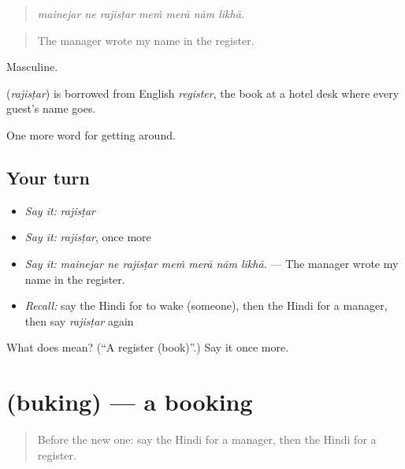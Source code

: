 \begin{quote}
\emph{mainejar ne rajisṭar meṁ merā nām likhā.}
\end{quote}

\begin{quote}
The manager wrote my name in the register.
\end{quote}

Masculine.

\begin{cousinweb}
\textbf{} (\emph{rajisṭar}) is borrowed from English \emph{register}, the book at a hotel desk where every guest's name goes.
\end{cousinweb}

\begin{grammarlens}[title={What you've built}]
One more word for getting around.
\end{grammarlens}

\subsection*{Your turn}
\begin{itemize}
\raggedright
  \item \emph{Say it:} \emph{rajisṭar}
  \item \emph{Say it:} \emph{rajisṭar}, once more
  \item \emph{Say it:} \emph{mainejar ne rajisṭar meṁ merā nām likhā.} — The manager wrote my name in the register.
  \item \emph{Recall:} say the Hindi for to wake (someone), then the Hindi for a manager, then say \emph{rajisṭar} again
\end{itemize}

\begin{tcolorbox}[breakable,colback=teal!4,colframe=teal!35!black,title={Before you move on}]
What does  mean? (\textquotedblleft{}A register (book)\textquotedblright{}.) Say it once more.
\end{tcolorbox}
\section[\texorpdfstring{\hi{बुकिंग} (buking)}{बुकिंग (buking)}]{ (buking) — a booking}

\label{lesson:HI-C415-buking}



\begin{quote}
Before the new one: say the Hindi for a manager, then the Hindi for a register.
\end{quote}

